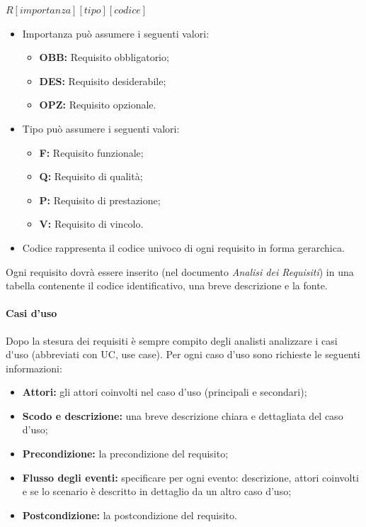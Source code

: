 \begin{center}
	\begin{math}
		R \left [ importanza \right ] \left [ tipo\right ]\left [codice\right ]
	\end{math}
\end{center}
	\begin{itemize}
		\item Importanza può assumere i seguenti valori:
		\begin{itemize}
			\item \textbf{OBB:} Requisito obbligatorio;
			\item \textbf{DES:} Requisito desiderabile;
			\item \textbf{OPZ:} Requisito opzionale.
		\end{itemize}
			\item Tipo può assumere i seguenti valori:
			\begin{itemize}
				\item \textbf{F:} Requisito funzionale;
				\item \textbf{Q:} Requisito di qualità;
				\item \textbf{P:} Requisito di prestazione;
				\item \textbf{V:} Requisito di vincolo.
			\end{itemize}
				\item Codice rappresenta il codice univoco di ogni requisito in forma gerarchica.
	\end{itemize}
				Ogni requisito dovrà essere inserito (nel documento \textit{Analisi dei Requisiti}) in una tabella contenente il codice identificativo, una breve descrizione e la fonte.

\paragraph{Casi d'uso}
Dopo la stesura dei requisiti è sempre compito degli analisti analizzare i \gls{casi d'uso} (abbreviati con UC, use case).
Per ogni caso d'uso sono richieste le seguenti informazioni:
\begin{itemize}
	\item \textbf{Attori:} gli attori coinvolti nel caso d'uso (principali e secondari);
	\item \textbf{Scodo e descrizione:} una breve descrizione chiara e dettagliata del caso d'uso;
	\item \textbf{Precondizione:} la precondizione del requisito;
	\item \textbf{Flusso degli eventi:} specificare per ogni evento: descrizione, attori coinvolti e se lo scenario è descritto in dettaglio da un altro caso d'uso;
	\item \textbf{Postcondizione:} la postcondizione del requisito.
	\end{itemize}
	
